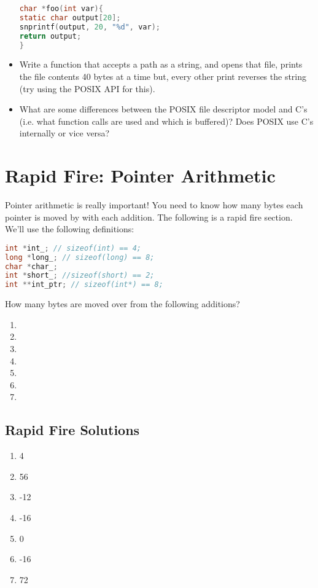 \begin{itemize}
	      \begin{lstlisting}[language=C]
char *foo(int var){
static char output[20];
snprintf(output, 20, "%d", var);
return output;
}
\end{lstlisting}
	\item
	      Write a function that accepts a path as a string, and opens that file, prints the file contents 40 bytes at a time but, every other print reverses the string (try using the POSIX API for this).
	\item
	      What are some differences between the POSIX file descriptor model and C's  (i.e. what function calls are used and which is buffered)? Does POSIX use C's  internally or vice versa?
\end{itemize}

\section{Rapid Fire: Pointer Arithmetic}

Pointer arithmetic is really important! You need to know how many bytes each pointer is moved by with each addition. The following is a rapid fire section. We'll use the following definitions:

\begin{lstlisting}[language=C]
int *int_; // sizeof(int) == 4;
long *long_; // sizeof(long) == 8;
char *char_;
int *short_; //sizeof(short) == 2;
int **int_ptr; // sizeof(int*) == 8;
\end{lstlisting}

How many bytes are moved over from the following additions?

\begin{enumerate}
\item {}
\item {}
\item {}
\item {}
\item {}
\item {}
\item {}
\end{enumerate}

\subsection{Rapid Fire Solutions}

\begin{enumerate}
\item 4
\item 56
\item -12
\item -16
\item 0
\item -16
\item 72
\end{enumerate}



